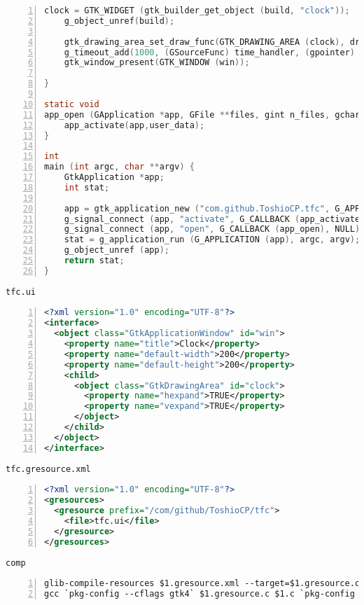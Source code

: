 \begin{lstlisting}[language=C, numbers=left]
    clock = GTK_WIDGET (gtk_builder_get_object (build, "clock"));
    g_object_unref(build);

    gtk_drawing_area_set_draw_func(GTK_DRAWING_AREA (clock), draw_clock, NULL, NULL);
    g_timeout_add(1000, (GSourceFunc) time_handler, (gpointer) clock);
    gtk_window_present(GTK_WINDOW (win));

}

static void
app_open (GApplication *app, GFile **files, gint n_files, gchar *hint, gpointer user_data) {
    app_activate(app,user_data);
}

int
main (int argc, char **argv) {
    GtkApplication *app;
    int stat;

    app = gtk_application_new ("com.github.ToshioCP.tfc", G_APPLICATION_HANDLES_OPEN);
    g_signal_connect (app, "activate", G_CALLBACK (app_activate), NULL);
    g_signal_connect (app, "open", G_CALLBACK (app_open), NULL);
    stat = g_application_run (G_APPLICATION (app), argc, argv);
    g_object_unref (app);
    return stat;
}
\end{lstlisting}

\passthrough{\lstinline!tfc.ui!}

\begin{lstlisting}[language=XML, numbers=left]
<?xml version="1.0" encoding="UTF-8"?>
<interface>
  <object class="GtkApplicationWindow" id="win">
    <property name="title">Clock</property>
    <property name="default-width">200</property>
    <property name="default-height">200</property>
    <child>
      <object class="GtkDrawingArea" id="clock">
        <property name="hexpand">TRUE</property>
        <property name="vexpand">TRUE</property>
      </object>
    </child>
  </object>
</interface>
\end{lstlisting}

\passthrough{\lstinline!tfc.gresource.xml!}

\begin{lstlisting}[language=XML, numbers=left]
<?xml version="1.0" encoding="UTF-8"?>
<gresources>
  <gresource prefix="/com/github/ToshioCP/tfc">
    <file>tfc.ui</file>
  </gresource>
</gresources>
\end{lstlisting}

\passthrough{\lstinline!comp!}

\begin{lstlisting}[numbers=left]
glib-compile-resources $1.gresource.xml --target=$1.gresource.c --generate-source
gcc `pkg-config --cflags gtk4` $1.gresource.c $1.c `pkg-config --libs gtk4` -lm
\end{lstlisting}
